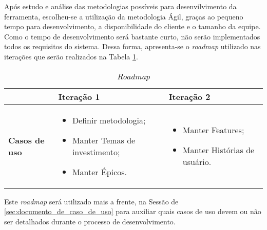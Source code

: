Após estudo e análise das metodologias possíveis para desenvilvimento da ferramenta, escolheu-se a utilização da metodologia Ágil, graças ao pequeno tempo para desenvolvimento, a disponibilidade do cliente e o tamanho da equipe. Como o tempo de desenvolvimento será bastante curto, não serão implementados todos os requisitos do sistema. Dessa forma, apresenta-se o \textit{roadmap} utilizado nas iterações que serão realizados na Tabela \ref{tab:primeiro_roadmap}.

\vspace{5mm}
\begin{table}[h]
\centering
\begin{tabular}{p{1cm}|p{6cm}|p{}|}

\cline{2-3} &
\textbf{Iteração 1} &
\textbf{Iteração 2}
\\ \hline
\multicolumn{1}{|p{1cm}|}{\textbf{Casos de uso}} &
\begin{itemize}
 	\item Definir metodologia;
 	\item Manter Temas de investimento;
	\item Manter Épicos.
\end{itemize} &
\begin{itemize}
 	\item Manter Features;
	\item Manter Histórias de usuário.
 \end{itemize} 
 \\ \hline
\end{tabular}
\caption{\textit{Roadmap}}
\label{tab:primeiro_roadmap}
\end{table}

Este \textit{roadmap} será utilizado mais a frente, na Sessão de \ref{sec:documento_de_caso_de_uso} para auxiliar quais casos de uso devem ou não ser detalhados durante o processo de desenvolvimento.